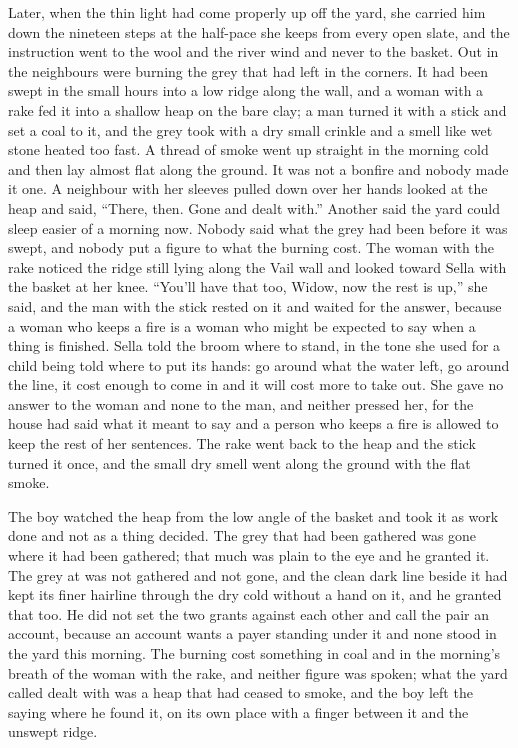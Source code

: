 Later, when the thin light had come properly up off the yard, she carried him down the nineteen steps at the half-pace she keeps from every open slate, and the instruction went to the wool and the river wind and never to the basket. Out in  the neighbours were burning the grey that  had left in the corners. It had been swept in the small hours into a low ridge along the wall, and a woman with a rake fed it into a shallow heap on the bare clay; a man turned it with a stick and set a coal to it, and the grey took with a dry small crinkle and a smell like wet stone heated too fast. A thread of smoke went up straight in the morning cold and then lay almost flat along the ground. It was not a bonfire and nobody made it one. A neighbour with her sleeves pulled down over her hands looked at the heap and said, “There, then. Gone and dealt with.” Another said the yard could sleep easier of a morning now. Nobody said what the grey had been before it was swept, and nobody put a figure to what the burning cost. The woman with the rake noticed the ridge still lying along the Vail wall and looked toward Sella with the basket at her knee. “You'll have that too, Widow, now the rest is up,” she said, and the man with the stick rested on it and waited for the answer, because a woman who keeps a fire is a woman who might be expected to say when a thing is finished. Sella told the broom where to stand, in the tone she used for a child being told where to put its hands: go around what the water left, go around the line, it cost enough to come in and it will cost more to take out. She gave no answer to the woman and none to the man, and neither pressed her, for the house had said what it meant to say and a person who keeps a fire is allowed to keep the rest of her sentences. The rake went back to the heap and the stick turned it once, and the small dry smell went along the ground with the flat smoke.

The boy watched the heap from the low angle of the basket and took it as work done and not as a thing decided. The grey that had been gathered was gone where it had been gathered; that much was plain to the eye and he granted it. The grey at  was not gathered and not gone, and the clean dark line beside it had kept its finer hairline through the dry cold without a hand on it, and he granted that too. He did not set the two grants against each other and call the pair an account, because an account wants a payer standing under it and none stood in the yard this morning. The burning cost something in coal and in the morning's breath of the woman with the rake, and neither figure was spoken; what the yard called dealt with was a heap that had ceased to smoke, and the boy left the saying where he found it, on its own place with a finger between it and the unswept ridge.

